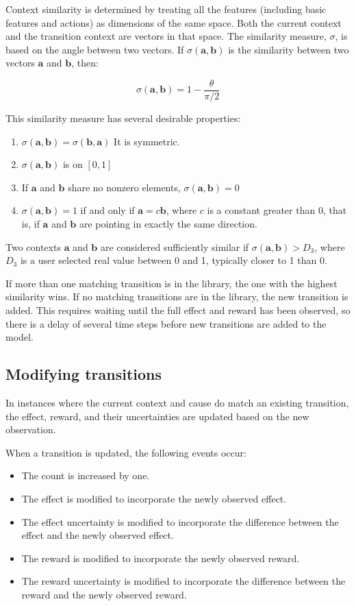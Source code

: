 Context similarity is determined by treating all the features (including basic features and actions) as dimensions of the same space. Both the current context and the transition context are vectors in that space. The similarity measure, $\sigma$, is based on the angle between two vectors. If $\sigma(\mathbf{a},\mathbf{b})$ is the similarity between two vectors $\mathbf{a}$ and $\mathbf{b}$, then:

\begin{equation}    
\sigma(\mathbf{a},\mathbf{b}) = 1 - \frac{\theta}{\pi/2}
\label{similarity}
\end{equation}

This similarity measure has several desirable properties:
\begin{enumerate}
\item $\sigma(\mathbf{a},\mathbf{b}) = \sigma(\mathbf{b},\mathbf{a})$ It is symmetric.
\item $\sigma(\mathbf{a},\mathbf{b})$ is on $[0,1]$
\item If $\mathbf{a}$ and $\mathbf{b}$ share no nonzero elements, $\sigma(\mathbf{a},\mathbf{b}) = 0$
\item $\sigma(\mathbf{a},\mathbf{b}) = 1$ if and only if $\mathbf{a} = c \mathbf{b}$, where $c$ is a constant greater than 0, that is, if $\mathbf{a}$ and $\mathbf{b}$ are pointing in exactly the same direction.
\end{enumerate}

Two contexts $\mathbf{a}$ and $\mathbf{b}$ are considered sufficiently similar if $\sigma(\mathbf{a},\mathbf{b}) > D_3$, where $D_3$ is a user selected real value between 0 and 1, typically closer to 1 than 0.

If more than one matching transition is in the library, the one with the highest similarity wins. If no matching transitions are in the library, the new transition is added. This requires waiting until the full effect and reward has been observed, so there is a delay of several time steps before new transitions are added to the model.

\subsection{Modifying transitions}
In instances where the current context and cause do match an existing transition, the effect, reward, and their uncertainties are updated based on the new observation.

When a transition is updated, the following events occur:
\begin{itemize}
\item The count is increased by one.
\item The effect is modified to incorporate the newly observed effect.
\item The effect uncertainty is modified to incorporate the difference between the effect and the newly observed effect.
\item The reward is modified to incorporate the newly observed reward.
\item The reward uncertainty is modified to incorporate the difference between the reward and the newly observed reward.
\end{itemize}

